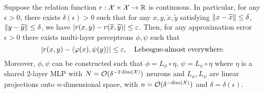 \begin{theorem}\label{theorem:asymemtric_inner_prod_rel_func_class}
    Suppose the relation function $r: {\mathcal{X}} \times {\mathcal{X}} \to \mathbb{R}$ is continuous. In particular, for any $\epsilon > 0$, there exists $\delta(\epsilon) > 0$ such that for any $x, y, \tilde{x}, \tilde{y}$ satisfying $\left\lVert x - \widetilde{x}\right\rVert \leq \delta$, $\left\lVert y - \widetilde{y}\right\rVert \leq \delta$, we have $\left\lvert r(x, y) - r(\widetilde{x}, \widetilde{y})\right\rvert \leq \varepsilon$. Then, for any approximation error $\epsilon > 0$ there exists multi-layer perceptrons $\phi, \psi$ such that
    \begin{equation*}
        \abs{r(x,y) - \iprod{\phi(x)}{\psi(y)}} \leq \epsilon, \quad \text{Lebesgue-almost everywhere.}
    \end{equation*}
    Moreover, $\phi, \psi$ can be constructed such that $\phi = L_\phi \circ \eta$, $\psi = L_\psi \circ \eta$ where $\eta$ is a shared 2-layer MLP with $N = {\mathcal{O}}(\delta^{- 2 \,\mathrm{dim}({\mathcal{X}})})$ neurons and $L_\phi, L_\psi$ are linear projections onto $n$-dimensional space, with $n = {\mathcal{O}}(\delta^{- \mathrm{dim}({\mathcal{X}})})$ and $\delta = \delta(\epsilon)$.
\end{theorem}
